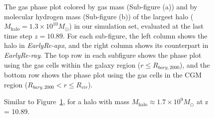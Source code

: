 \documentclass[linenumbers, twocolumn]{aastex631}
\begin{document}
\begin{figure}
    \caption{The gas phase plot colored by gas mass (Sub-figure (a)) and by molecular hydrogen mass (Sub-figure (b)) of the largest halo ($M_{\mathrm{halo}} = 1.3\times10^{10} M_\odot$) in our simulation set, evaluated at the last time step $z = 10.89$. For each sub-figure, the left column shows the halo in \textit{EarlyRe-apx}, and the right column shows its counterpart in \textit{EarlyRe-ray}. The top row in each subfigure shows the phase plot using the gas cells within the galaxy region ($r \leq R_{bary,2000}$), and the bottom row shows the phase plot using the gas cells in the CGM region ($R_{bary,2000} < r \leq R_{vir}$).} 
    \label{fig:phaseplot_Halo0-0}
\end{figure}

\begin{figure}
    \caption{Similar to Figure~\ref{fig:phaseplot_Halo0-0}, for a halo with mass $M_{\mathrm{halo}} \approx 1.7\times 10^{9} M_\odot$ at z = 10.89.}
    \label{fig:phaseplot_Halo8-9}
\end{figure}
\end{document}
